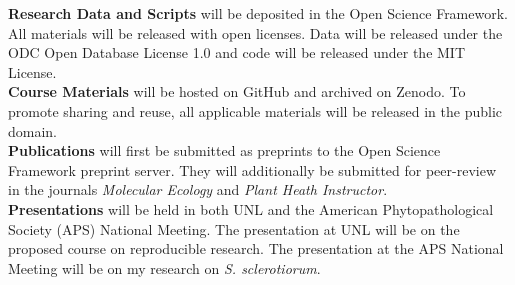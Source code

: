 \documentclass[12pt,letterpaper]{article}
\begin{document}
\noindent \textbf{Research Data and Scripts} will be deposited in the Open Science Framework. All materials will be released with open licenses. Data will be released under the ODC Open Database License 1.0 and code will be released under the MIT License. \\
\noindent \textbf{Course Materials} will be hosted on GitHub and archived on Zenodo. To promote sharing and reuse, all applicable materials will be released in the public domain. \\
\noindent \textbf{Publications} will first be submitted as preprints to the Open Science Framework preprint server. They will additionally be submitted for peer-review in the journals \textit{Molecular Ecology} and \textit{Plant Heath Instructor}. \\
\noindent \textbf{Presentations} will be held in both UNL and the American Phytopathological Society (APS) National Meeting. The presentation at UNL will be on the proposed course on reproducible research. The presentation at the APS National Meeting will be on my research on \textit{S. sclerotiorum}.


\newpage
\AtBeginShipout{%
\AtBeginShipoutDiscard
}

\printbibliography
\end{document}
